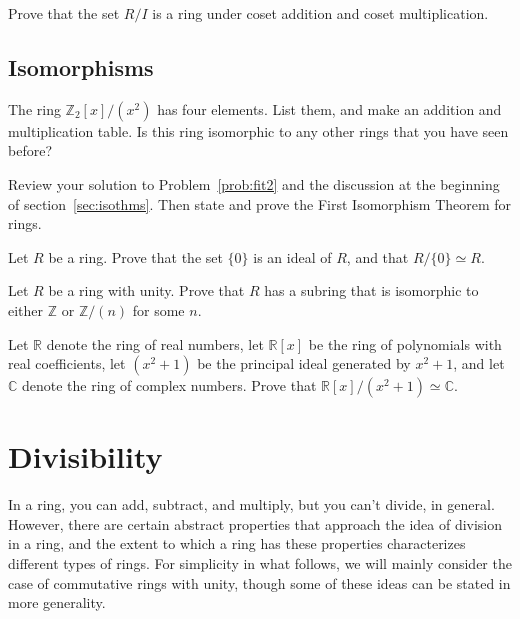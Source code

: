 \begin{problem}
Prove that the set \(R/I\) is a ring under coset addition and coset multiplication.
\end{problem}

\section{Isomorphisms}

\begin{problem}
The ring \(\mathbb{Z}_2[x]/(x^2)\) has four elements. List them, and make an addition and multiplication table. Is this ring isomorphic to any other rings that you have seen before?
\end{problem}

\begin{problem}
Review your solution to Problem~\ref{prob:fit2} and the discussion at the beginning of section~\ref{sec:isothms}. Then state and prove the First Isomorphism Theorem for rings.
\end{problem}

\begin{problem}
Let \(R\) be a ring. Prove that the set \(\{0\}\) is an ideal of \(R\), and that \(R/\{0\} \simeq R\).
\end{problem}

\begin{problem}
 Let \(R\) be a ring with unity. Prove that \(R\) has a subring that is isomorphic to either \(\mathbb{Z}\) or \(\mathbb{Z}/ (n)\) for some \(n\).
\end{problem}

\begin{problem}
Let \(\mathbb{R}\) denote the ring of real numbers, let \(\mathbb{R}[x]\) be the ring of polynomials with real coefficients, let \( (x^2+1) \) be the principal ideal generated by \(x^2+1\),  and let \(\mathbb{C}\) denote the ring of complex numbers. Prove that \(\mathbb{R}[x]/( x^2+1) \simeq \mathbb{C} \).
\end{problem}

\chapter{Divisibility}
In a ring, you can add, subtract, and multiply, but you can't divide, in general. However, there are certain abstract properties that approach the idea of division in a ring, and the extent to which a ring has these properties characterizes different types of rings. For simplicity in what follows, we will mainly consider the case of commutative rings with unity, though some of these ideas can be stated in more generality.

